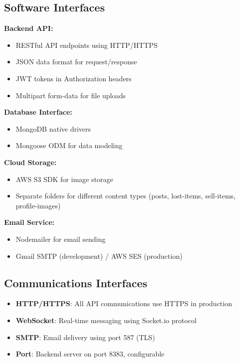 \documentclass[12pt,a4paper]{article}
\begin{document}
\subsection{Software Interfaces}
\textbf{Backend API:}
\begin{itemize}
    \item RESTful API endpoints using HTTP/HTTPS
    \item JSON data format for request/response
    \item JWT tokens in Authorization headers
    \item Multipart form-data for file uploads
\end{itemize}

\textbf{Database Interface:}
\begin{itemize}
    \item MongoDB native drivers
    \item Mongoose ODM for data modeling
\end{itemize}

\textbf{Cloud Storage:}
\begin{itemize}
    \item AWS S3 SDK for image storage
    \item Separate folders for different content types (posts, lost-items, sell-items, profile-images)
\end{itemize}

\textbf{Email Service:}
\begin{itemize}
    \item Nodemailer for email sending
    \item Gmail SMTP (development) / AWS SES (production)
\end{itemize}

\subsection{Communications Interfaces}
\begin{itemize}
    \item \textbf{HTTP/HTTPS}: All API communications use HTTPS in production
    \item \textbf{WebSocket}: Real-time messaging using Socket.io protocol
    \item \textbf{SMTP}: Email delivery using port 587 (TLS)
    \item \textbf{Port}: Backend server on port 8383, configurable
\end{itemize}

\end{document}
